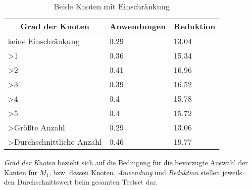 \begin{table}[h]
\caption{Beide Knoten mit Einschränkung\label{tab:degreeAND}}
\vspace*{1em}
\centering

\bgroup
\def\arraystretch{1.3}%

\begin{threeparttable}
\begin{tabular}[c]{lll}
	\hline
	\multicolumn{1}{c}{\textbf{Grad der Knoten}} & 
	\multicolumn{1}{c}{\textbf{Anwendungen}} & 
	\multicolumn{1}{c}{\textbf{Reduktion}} \\ 
	
	\hline

	keine Einschränkung&0.29&13.04\\
	>1&0.36 &15.34 \\
	>2&0.41 &16.96 \\
	>3& 0.39& 16.52 \\
	>4& 0.4 &15.78 \\
	>5& 0.4 & 15.72\\
	>Größte Anzahl& 0.29 &13.06 \\
	>Durchschnittliche Anzahl& 0.46&19.77 \\
	\hline
\end{tabular}
\begin{tablenotes}\footnotesize
\item \emph{Grad der Knoten} bezieht sich auf die Bedingung für die bevorzugte Auswahl der Kanten für $M_{1}$, bzw. dessen Knoten. \emph{Anwendung} und \emph{Reduktion} stellen jeweils den Durchschnittswert beim gesamten Testset dar.
\end{tablenotes}

\end{threeparttable}

\egroup

\end{table}

